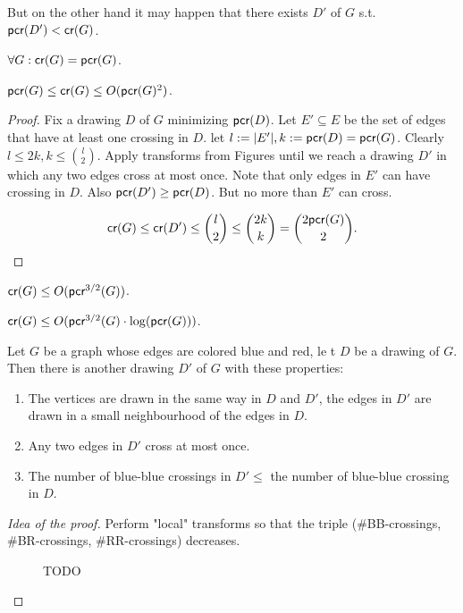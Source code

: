 But on the other hand it may happen that there exists $D'$ of $G$ s.t. $\textsf{pcr}(D') < \textsf{cr}(G)$.

\begin{conj}
	$\forall G: \textsf{cr}(G) = \textsf{pcr}(G)$.
\end{conj}

\begin{thm}
	$\textsf{pcr}(G) \leq \textsf{cr}(G) \leq O(\textsf{pcr}(G)^2)$.
\end{thm}

\begin{proof}
	Fix a drawing $D$ of $G$ minimizing $\textsf{pcr}(D)$. Let $E' \subseteq E$ be the set of edges that have at least one crossing in $D$. let $l := |E'|, k:= \textsf{pcr}(D) = \textsf{pcr}(G)$. Clearly $l \leq 2k, k \leq \binom{l}{2}$. Apply transforms from Figures  until we reach a drawing $D'$ in which any two edges cross at most once. Note that only edges in $E'$ can have crossing in $D$. Also $\textsf{pcr}(D') \geq \textsf{pcr}(D)$. But no more than $E'$ can cross.
	
	$$
	\textsf{cr}(G) \leq \textsf{cr}(D') \leq \binom{l}{2} \leq \binom{2k}{k} = \binom{2 \textsf{pcr}(G)}{2}.
	$$
\end{proof}

\begin{thm}
	$\textsf{cr}(G) \leq O(\textsf{pcr}^{3/2}(G))$.
\end{thm}

\begin{thm}
	$\textsf{cr}(G) \leq O(\textsf{pcr}^{3/2}(G) \cdot \log (\textsf{pcr}(G)))$.
\end{thm}

\begin{lemma}
	Let $G$ be a graph whose edges are colored blue and red, le t $D$ be a drawing of $G$. Then there is another drawing $D'$ of $G$ with these properties:
	
	\begin{enumerate}
		\item The vertices are drawn in the same way in $D$ and $D'$, the edges in $D'$ are drawn in a small neighbourhood of the edges in $D$.
		\item Any two edges in $D'$ cross at most once.
		\item The number of blue-blue crossings in $D' \leq$ the number of blue-blue crossing in $D$.
	\end{enumerate}
	\label{blue-red}
\end{lemma}

\begin{proof}[Idea of the proof]
	Perform "local" transforms so that the triple (\#BB-crossings, \#BR-crossings, \#RR-crossings) decreases.
	
	\begin{figure}
		\caption{TODO}
	\end{figure}
\end{proof}

